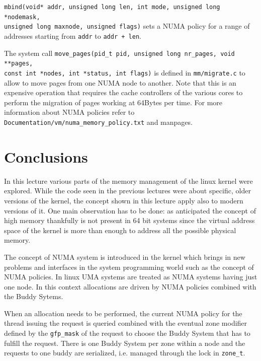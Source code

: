 \documentclass[twoside]{article}
\begin{document}
\texttt{mbind(void* addr, unsigned long len, int mode, unsigned long *nodemask,
\\ unsigned long maxnode, unsigned flags)} sets a NUMA policy for a range of
addresses starting from \texttt{addr} to \texttt{addr + len}.

The system call \texttt{move_pages(pid_t pid, unsigned long nr_pages, void **pages,
\\ const int *nodes, int *status, int flags)} is defined in
\texttt{mm/migrate.c} to allow to move pages from one NUMA node to another. Note
that this is an expensive operation that requires the cache controllers of the
various cores to perform the migration of pages working at 64Bytes per time. For
more information about NUMA policies refer to \\
\texttt{Documentation/vm/numa_memory_policy.txt} and manpages.

\section{Conclusions}
\label{sec:Conclusions}

In this lecture various parts of the memory management of the linux kernel were
explored. While the code seen in the previous lectures were about specific,
older versions of the kernel, the concept shown in this lecture apply also to
modern versions of it. One main observation has to be done: as anticipated the
concept of high memory thankfully is not present in 64 bit systems since the virtual
address space of the kernel is more than enough to address all the possible
physical memory.

The concept of NUMA system is introduced in the kernel which brings in new
problems and
interfaces in the system programming world such as the concept of NUMA policies.
In linux UMA systems are treated as NUMA systems having just one node. In this
context allocations are driven by NUMA policies combined with the Buddy Sytems.

When an allocation needs to be performed, the current NUMA policy for the thread
issuing the request is queried combined with the eventual zone modifier defined
by the \texttt{gfp_mask} of the request to choose the Buddy System that has to
fulfill the request. There is one Buddy System per zone within a node and the
requests to one buddy are serialized, i.e. managed through the lock in
\texttt{zone_t}.



\newpage


\end{document}
